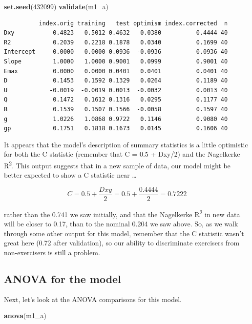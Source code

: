 \documentclass[]{book}
\newenvironment{Shaded}{\begin{snugshade}}{\end{snugshade}}
\newcommand{\KeywordTok}[1]{\textcolor[rgb]{0.13,0.29,0.53}{\textbf{#1}}}
\newcommand{\DecValTok}[1]{\textcolor[rgb]{0.00,0.00,0.81}{#1}}
\newcommand{\NormalTok}[1]{#1}
\theoremstyle{definition}
\theoremstyle{definition}
\theoremstyle{definition}
\theoremstyle{remark}
\begin{document}
\begin{Shaded}
\begin{Highlighting}[]
\KeywordTok{set.seed}\NormalTok{(}\DecValTok{432099}\NormalTok{)}
\KeywordTok{validate}\NormalTok{(m1_a)}
\end{Highlighting}
\end{Shaded}

\begin{verbatim}
          index.orig training   test optimism index.corrected  n
Dxy           0.4823   0.5012 0.4632   0.0380          0.4444 40
R2            0.2039   0.2218 0.1878   0.0340          0.1699 40
Intercept     0.0000   0.0000 0.0936  -0.0936          0.0936 40
Slope         1.0000   1.0000 0.9001   0.0999          0.9001 40
Emax          0.0000   0.0000 0.0401   0.0401          0.0401 40
D             0.1453   0.1592 0.1329   0.0264          0.1189 40
U            -0.0019  -0.0019 0.0013  -0.0032          0.0013 40
Q             0.1472   0.1612 0.1316   0.0295          0.1177 40
B             0.1539   0.1507 0.1566  -0.0058          0.1597 40
g             1.0226   1.0868 0.9722   0.1146          0.9080 40
gp            0.1751   0.1818 0.1673   0.0145          0.1606 40
\end{verbatim}

It appears that the model's description of summary statistics is a
little optimistic for both the C statistic (remember that C = 0.5 +
Dxy/2) and the Nagelkerke R\textsuperscript{2}. This output suggests
that in a new sample of data, our model might be better expected to show
a C statistic near \ldots{}

\[ 
C = 0.5 + \frac{Dxy}{2} = 0.5 + \frac{0.4444}{2} = 0.7222
\]

rather than the 0.741 we saw initially, and that the Nagelkerke
R\textsuperscript{2} in new data will be closer to 0.17, than to the
nominal 0.204 we saw above. So, as we walk through some other output for
this model, remember that the C statistic wasn't great here (0.72 after
validation), so our ability to discriminate exercisers from
non-exercisers is still a problem.

\subsection{ANOVA for the model}\label{anova-for-the-model}

Next, let's look at the ANOVA comparisons for this model.

\begin{Shaded}
\begin{Highlighting}[]
\KeywordTok{anova}\NormalTok{(m1_a)}
\end{Highlighting}
\end{Shaded}
\end{document}
